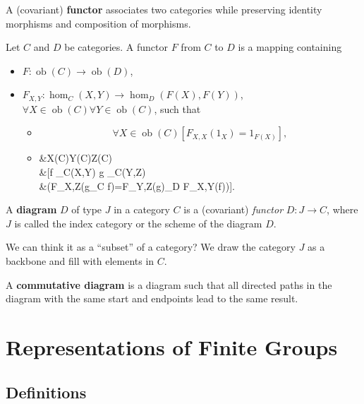 \documentclass[12pt, letterpaper]{article}
\newcommand{\ob}{\operatorname{ob}}
\newenvironment{eqlong}{\equation\aligned}{\endaligned\endequation}
\theoremstyle{definition}
\theoremstyle{remark}
\theoremstyle{definition}
\theoremstyle{plain}
\numberwithin{equation}{section}
\begin{document}
	\begin{def*}[functor]
		A (covariant) \textbf{functor} associates two categories while preserving identity morphisms and composition of morphisms.
	\end{def*}
	Let $C$ and $D$ be categories.
	A functor $F$ from $C$ to $D$ is a mapping containing
	\begin{itemize}
		\item $F\colon \ob(C) \to \ob(D)$,
		\item $F_{X,Y}\colon \hom_C(X, Y) \to \hom_D(F(X), F(Y))$, $\forall X \in \ob(C)\forall Y\in \ob(C)$,
		such that
		\begin{itemize}
			\item 
			\begin{equation}
				\forall X \in \ob(C) [F_{X,X}(1_X)=1_{F(X)}],
			\end{equation}
			\item
			\begin{eqlong}
				&\forall X\in \ob(C)\forall Y\in \ob(C)\forall Z\in \ob(C)\\
				&[\forall f \in \hom_C(X,Y)	\forall g \in \hom_C(Y,Z)\\
				&(F_{X,Z}(g\circ_C f)=F_{Y,Z}(g)\circ_D F_{X,Y}(f))].\\
			\end{eqlong}
		\end{itemize}
	\end{itemize}

	\begin{def*}[diagram]
		A \textbf{diagram} $D$ of type $J$ in a category $C$ is a (covariant) \textit{functor} $D \colon J \to C$,
		where $J$ is called the index category or the scheme of the diagram $D$.
	\end{def*}
	We can think it as a ``subset'' of a category?
	We draw the category $J$ as a backbone and fill with elements in $C$.

	\begin{def*}
		A \textbf{commutative diagram} is a diagram such that all directed paths in the diagram with the same start and endpoints lead to the same result.
	\end{def*}

	\section{Representations of Finite Groups}
	\subsection{Definitions}
\end{document}
